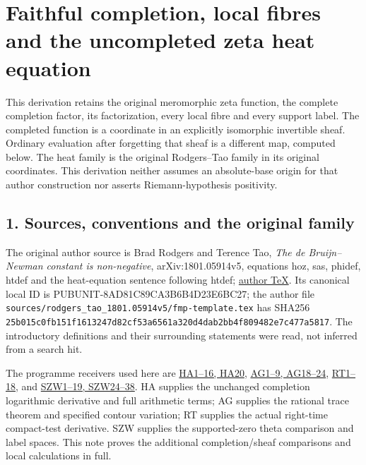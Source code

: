 \documentclass[
  10pt,
  a4paper,
]{article}
\author{}
\date{}
\begin{document}
{
\setcounter{tocdepth}{3}
\tableofcontents
}
\section{Faithful completion, local fibres and the uncompleted zeta heat
equation}\label{faithful-completion-local-fibres-and-the-uncompleted-zeta-heat-equation}

This derivation retains the original meromorphic zeta function, the
complete completion factor, its factorization, every local fibre and
every support label. The completed function is a coordinate in an
explicitly isomorphic invertible sheaf. Ordinary evaluation after
forgetting that sheaf is a different map, computed below. The heat
family is the original Rodgers--Tao family in its original coordinates.
This derivation neither assumes an absolute-base origin for that author
construction nor asserts Riemann-hypothesis positivity.

\subsection{1. Sources, conventions and the original
family}\label{sources-conventions-and-the-original-family}

The original author source is Brad Rodgers and Terence Tao, \emph{The de
Bruijn--Newman constant is non-negative}, arXiv:1801.05914v5, equations
hoz, sas, phidef, htdef and the heat-equation sentence following htdef;
\href{https://arxiv.org/src/1801.05914v5}{author TeX}. Its canonical
local ID is PUBUNIT-8AD81C89CA3B6B4D23E6BC27; the author file
\texttt{sources/\allowbreak{}rodgers\_\allowbreak{}tao\_\allowbreak{}1801.\allowbreak{}05914v5/\allowbreak{}fmp-\allowbreak{}template.\allowbreak{}tex} has SHA256
\texttt{25b015c0\allowbreak{}fb151f16\allowbreak{}13247d82\allowbreak{}cf53a656\allowbreak{}1a320d4d\allowbreak{}ab2bb4f8\allowbreak{}09482e7c\allowbreak{}477a5817}.
The introductory definitions and their surrounding statements were read,
not inferred from a search hit.

The programme receivers used here are
\href{HEAT_CAUCHY_ARITHMETIC_DERIVATION.md}{HA1--16, HA20},
\href{ACTUAL_HEAT_ZERO_DISTRIBUTION_VARIATION.md}{AG1--9, AG18--24},
\href{REAL_TIME_HEAT_TRACE_DERIVATION.md}{RT1--18}, and
\href{SUPPORTED_ZERO_PRIME_WEIL_DERIVATION.md}{SZW1--19, SZW24--38}. HA
supplies the unchanged completion logarithmic derivative and full
arithmetic terms; AG supplies the rational trace theorem and specified
contour variation; RT supplies the actual right-time compact-test
derivative. SZW supplies the supported-zero theta comparison and label
spaces. This note proves the additional completion/sheaf comparisons and
local calculations in full.
\end{document}
